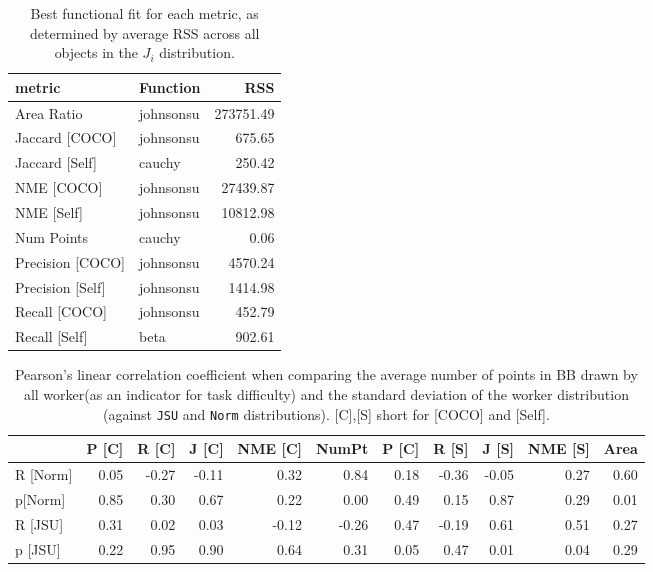 \documentclass[12pt]{article}
\begin{document}
\begin{appendices}
\begin{table}[ht]
\centering
\begin{tabular}{llr}
\hline
 metric           & Function   &       RSS \\
\hline
 Area Ratio       & johnsonsu  & 273751.49 \\
 Jaccard [COCO]   & johnsonsu  &    675.65 \\
 Jaccard [Self]   & cauchy     &    250.42 \\
 NME [COCO]       & johnsonsu  &  27439.87 \\
 NME [Self]       & johnsonsu  &  10812.98 \\
 Num Points       & cauchy     &      0.06 \\
 Precision [COCO] & johnsonsu  &   4570.24 \\
 Precision [Self] & johnsonsu  &   1414.98 \\
 Recall [COCO]    & johnsonsu  &    452.79 \\
 Recall [Self]    & beta       &    902.61 \\
\hline
\end{tabular}
\caption{Best functional fit for each metric, as determined by average RSS across all objects in the $J_i$ distribution.}
\label{all_Ji_fit}
\end{table}
\begin{table}[ht]
\centering
\begin{tabular}{lrrrrrrrrrr}
\hline
          &   P [C] &   R [C] &   J [C] &   NME [C] &   NumPt &   P [C] &   R [S] &   J [S] &   NME [S] &   Area \\
\hline
 R [Norm] &    0.05 &   -0.27 &   -0.11 &      0.32 &    0.84 &    0.18 &   -0.36 &   -0.05 &      0.27 &   0.60 \\
 p[Norm]  &    0.85 &    0.30 &    0.67 &      0.22 &    0.00 &    0.49 &    0.15 &    0.87 &      0.29 &   0.01 \\
 R [JSU]  &    0.31 &    0.02 &    0.03 &     -0.12 &   -0.26 &    0.47 &   -0.19 &    0.61 &      0.51 &   0.27 \\
 p [JSU]  &    0.22 &    0.95 &    0.90 &      0.64 &    0.31 &    0.05 &    0.47 &    0.01 &      0.04 &   0.29 \\
\hline
\end{tabular}
\caption{Pearson's linear correlation coefficient when comparing the average number of points in BB drawn by all worker(as an indicator for task difficulty) and the standard deviation of the worker distribution (against \texttt{JSU} and \texttt{Norm} distributions). [C],[S] short for [COCO] and [Self].}
\label{assum3}
\end{table}
\newpage

\end{appendices}
\end{document}
